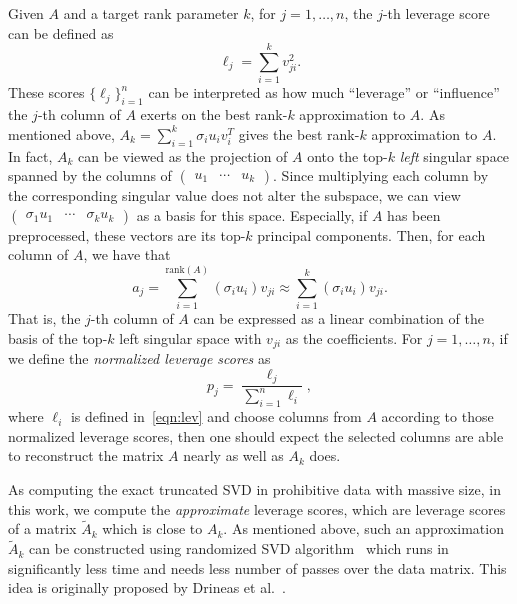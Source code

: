 Given $A$ and a target rank parameter $k$, for $j=1,\ldots,n$, the $j$-th leverage score can be defined as
\begin{equation}
 \label{eqn:lev}
  \ell_j = \sum_{i=1}^k v_{ji}^2.
\end{equation}
These scores $\{\ell_j\}_{i=1}^{n}$ can be interpreted as how much ``leverage'' or ``influence'' the $j$-th column of $A$ exerts on the best rank-$k$ approximation to $A$. 
As mentioned above, $A_k = \sum_{i=1}^k \sigma_i u_i v_i^T$ gives the best rank-$k$ approximation to $A$.
In fact, $A_k$ can be viewed as the projection of $A$ onto the top-$k$ \emph{left} singular space spanned by the columns of $\begin{pmatrix} u_1 & \cdots & u_k \end{pmatrix}$.
Since multiplying each column by the corresponding singular value does not alter the subspace, we can view
$\begin{pmatrix} \sigma_1 u_1 & \cdots & \sigma_k u_k \end{pmatrix}$ as a basis for this space.  
Especially, if $A$ has been preprocessed, these vectors are its top-$k$ principal components.
Then, for each column of $A$, we have that
  $$  a_j = \sum_{i=1}^{\text{rank}(A)} (\sigma_i u_i) v_{ji} \approx \sum_{i=1}^k (\sigma_i u_i) v_{ji}.  $$
That is, the $j$-th column of $A$ can be expressed as a linear combination of the basis of the top-$k$ left singular space with $v_{ji}$ as the coefficients.
For $j=1,\ldots,n$, if we define the {\it normalized leverage scores} as
\begin{equation}
\label{eqn:nlev}
  p_j = \frac{\ell_j}{\sum_{i=1}^n \ell_i},
\end{equation}      
where $\ell_i$ is defined in~\eqref{eqn:lev} and choose columns from $A$ according to those normalized leverage scores, then one should expect
the selected columns are able to reconstruct the matrix $A$ nearly as well as $A_k$ does.

As computing the exact truncated SVD in prohibitive data with massive size, 
in this work, we compute the {\it approximate} leverage scores, which are leverage scores of a matrix $\tilde A_k$ which is close to $A_k$. As mentioned above, such an approximation $\tilde A_k$ can be constructed using randomized SVD algorithm~\cite{HMT11} which runs in significantly less time and needs less number of passes over the data matrix. This idea is originally proposed by Drineas et al.~\cite{DMMW12_JMLR}. 

